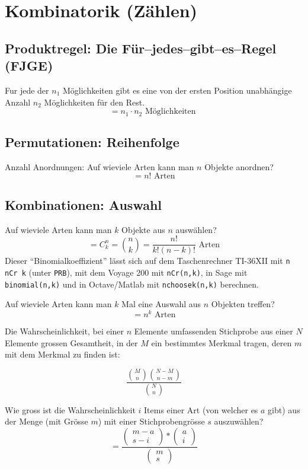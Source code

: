 \section{Kombinatorik (Zählen)}
\subsection{Produktregel: Die Für–jedes–gibt–es–Regel (FJGE)}
Fur jede der $n_1$ Möglichkeiten gibt es eine von der
ersten Position unabhängige Anzahl $n_2$ Möglichkeiten für den Rest.
\[ = n_1 \cdot n_2 \text{ Möglichkeiten } \]

\subsection{Permutationen: Reihenfolge}
Anzahl Anordnungen: Auf wieviele Arten kann man $n$ Objekte anordnen?
\[ = n! \text{ Arten} \]

\subsection{Kombinationen: Auswahl}
Auf wieviele Arten kann man $k$ Objekte aus $n$ auswählen?
\[ = C^n_k=\binom{n}{k} = \frac{n!}{k!(n-k)!} \text{ Arten} \]
Dieser "`Binomialkoeffizient"' lässt sich auf dem Taschenrechner
TI-36XII mit \texttt{n nCr k} (unter \texttt{PRB}), mit dem Voyage 200
mit \texttt{nCr(n,k)}, in Sage mit \texttt{binomial(n,k)} und in 
Octave/Matlab mit \texttt{nchoosek(n,k)} berechnen.

Auf wieviele Arten kann man $k$ Mal eine Auswahl aus $n$ Objekten
treffen?
\[ = n^k \text{ Arten} \]

Die Wahrscheinlichkeit, bei einer $n$ Elemente umfassenden Stichprobe
aus einer $N$ Elemente grossen Gesamtheit, in der $M$ ein bestimmtes
Merkmal tragen, deren $m$ mit dem Merkmal zu finden ist:

\[ \frac{\binom{M}{n} \binom{N-M}{n-m}}{\binom{N}{n}} \]

Wie gross ist die Wahrscheinlichkeit $i$ Items einer Art (von welcher es $a$ gibt) aus der Menge (mit Grösse $m$) mit einer Stichprobengrösse $s$ auszuwählen?
\[ = \frac{
	\begin{pmatrix}m-a\\s-i\end{pmatrix}
	*
	\begin{pmatrix}a\\i\end{pmatrix}
}
{	\begin{pmatrix}m\\s\end{pmatrix}
} \]

